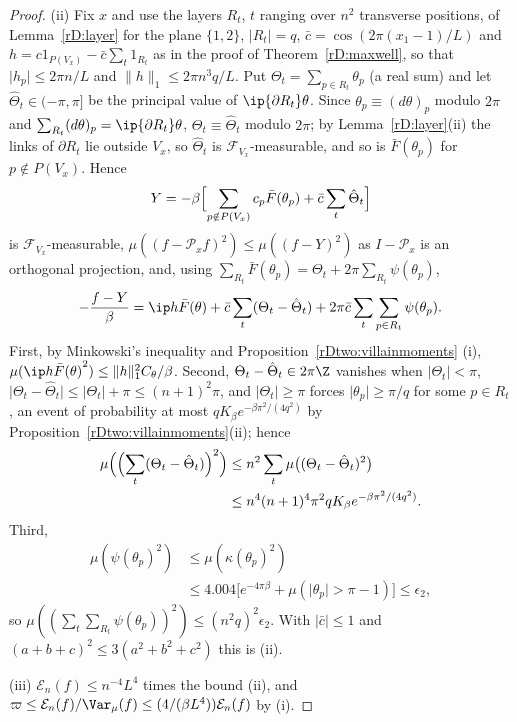 \begin{proof}
(ii) Fix $x$ and use the layers $R_t$, $t$ ranging over $n^2$ transverse
positions, of Lemma~\ref{rD:layer} for the plane $\{1,2\}$, $\lvert R_t\rvert
=q$, $\bar c=\cos(2\pi(x_1-1)/L)$ and $h=c1_{P(V_x)}-\bar c\sum_t1_{R_t}$ as in
the proof of Theorem~\ref{rD:maxwell}, so that $\lvert h_p\rvert\le2\pi n/L$
and $\lVert h\rVert_1\le2\pi n^3q/L$. Put $\Theta_t=\sum_{p\in R_t}\theta_p$ (a
real sum) and let $\hat\Theta_t\in(-\pi,\pi]$ be the principal value of
$\ip{\partial R_t}\theta$. Since $\theta_p\equiv(d\theta)_p$ modulo $2\pi$ and
$\sum_{R_t}(d\theta)_p=\ip{\partial R_t}\theta$, $\Theta_t\equiv\hat\Theta_t$
modulo $2\pi$; by Lemma~\ref{rD:layer}(ii) the links of $\partial R_t$ lie
outside $V_x$, so $\hat\Theta_t$ is $\mathcal F_{V_x}$-measurable, and so is
$\bar F(\theta_p)$ for $p\notin P(V_x)$. Hence
\[
Y=-\beta\Bigl[\sum_{p\notin P(V_x)}c_p\bar F(\theta_p)+\bar c\sum_t\hat\Theta_t
\Bigr]
\]
is $\mathcal F_{V_x}$-measurable, $\mu((f-\mathcal P_xf)^2)\le\mu((f-Y)^2)$
as $I-\mathcal P_x$ is an orthogonal projection, and, using $\sum_{R_t}\bar F
(\theta_p)=\Theta_t+2\pi\sum_{R_t}\psi(\theta_p)$,
\[
-\frac{f-Y}\beta=\ip h{\bar F(\theta)}+\bar c\sum_t(\Theta_t-\hat\Theta_t)
+2\pi\bar c\sum_t\sum_{p\in R_t}\psi(\theta_p).
\]
First, by Minkowski's inequality and Proposition~\ref{rDtwo:villainmoments}
(i), $\mu(\ip h{\bar F(\theta)}^2)\le\lVert h\rVert_1^2C_\theta/\beta$. Second,
$\Theta_t-\hat\Theta_t\in2\pi\Z$ vanishes when $\lvert\Theta_t\rvert<\pi$,
$\lvert\Theta_t-\hat\Theta_t\rvert\le\lvert\Theta_t\rvert+\pi\le(n+1)^2\pi$, and
$\lvert\Theta_t\rvert\ge\pi$ forces $\lvert\theta_p\rvert\ge\pi/q$ for some
$p\in R_t$, an event of probability at most $qK_\beta e^{-\beta\pi^2/(4q^2)}$
by Proposition~\ref{rDtwo:villainmoments}(ii); hence
\[
\begin{split}
\mu\Bigl(\Bigl(\sum_t(\Theta_t-\hat\Theta_t)\Bigr)^2\Bigr)
&\le n^2\sum_t\mu\bigl((\Theta_t-\hat\Theta_t)^2\bigr)\\
&\le n^4(n+1)^4\pi^2qK_\beta e^{-\beta\pi^2/(4q^2)}.
\end{split}
\]
Third,
\[
\begin{split}
\mu(\psi(\theta_p)^2)&\le\mu(\kappa(\theta_p)^2)\\
&\le4.004\bigl[e^{-4\pi\beta}+\mu(\lvert\theta_p\rvert>\pi-1)\bigr]\le\epsilon_2,
\end{split}
\]
so $\mu((\sum_t\sum_{R_t}\psi(\theta_p))^2)\le(n^2q)^2\epsilon_2$.
With $\lvert\bar c\rvert\le1$ and $(a+b+c)^2\le3(a^2+b^2+c^2)$ this is (ii).

(iii) $\mathcal E_n(f)\le n^{-4}L^4$ times the bound (ii), and $\varpi\le
\mathcal E_n(f)/\Var_\mu(f)\le(4/(\beta L^4))\mathcal E_n(f)$ by (i).
\end{proof}

